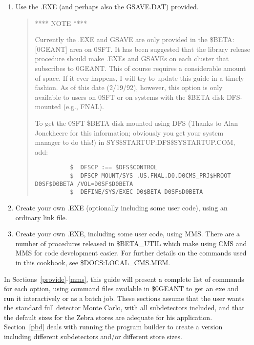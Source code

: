 \begin{enumerate}

\item Use the .EXE (and perhaps also the GSAVE.DAT) provided.

\begin{quotation}
\centerline{**** NOTE ****}
 Currently the .EXE and GSAVE are only provided in the
\$BETA:[\D0GEANT] area on \D0SFT.  It has been suggested that the library
release procedure should make .EXEs and GSAVEs on each cluster that subscribes
to \D0GEANT.  This of course requires a considerable amount of space.  If it
ever happens, I will try to update this guide in a timely fashion.  As of this
date (2/19/92), however, this option is only available to users on \D0SFT or on
systems with the \$BETA disk DFS-mounted (e.g., FNAL).

To get the \D0SFT \$BETA disk mounted using DFS (Thanks to Alan
Jonckheere for this information; obviously you get your system manager to do
this!) in SYS\$STARTUP:DFS\$SYSTARTUP.COM, add:

\begin{verbatim}
          $  DFSCP :== $DFS$CONTROL
          $  DFSCP MOUNT/SYS .US.FNAL.D0.D0CMS_PRJ$HROOT D0SF$D0BETA /VOL=D0SF$D0BETA
          $  DEFINE/SYS/EXEC D0$BETA D0SF$D0BETA
\end{verbatim}
\end{quotation}

\item Create your own .EXE (optionally including some user code), using an
ordinary link file.

\item Create your own .EXE, including some user code, using MMS.  There are a
number of procedures released in \$BETA\_UTIL which make using CMS and MMS
for code development easier.  For further details on the commands used in this
cookbook, see \$DOCS:LOCAL\_CMS.MEM.

\end{enumerate}
 
In Sections~\ref{provide}-\ref{mms}, this guide will present a complete list of
commands for each option, using command files available in \$\D0GEANT to get
an exe and run it interactively or as a batch job. These sections assume that
the user wants the standard full detector Monte Carlo, with all subdetectors
included, and that the default sizes for the Zebra stores are adequate for his
application. Section~\ref{pbd} deals with running the program builder to create
a version including different subdetectors and/or different store sizes.


